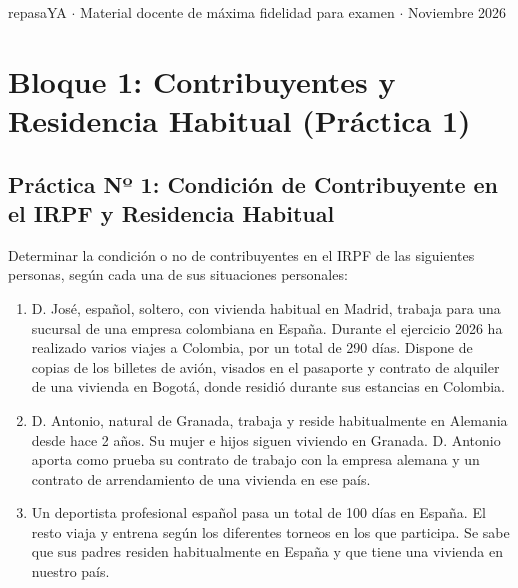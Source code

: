 \documentclass[11pt,a4paper,openany]{article}
\begin{document}
\begin{titlepage}
    \vfill
    {\footnotesize\textsf{\color{gray}repasaYA $\cdot$ Material docente de máxima fidelidad para examen $\cdot$ Noviembre 2026}\par}
\end{titlepage}

\newpage
\tableofcontents
\newpage

\section{Bloque 1: Contribuyentes y Residencia Habitual (Práctica 1)}

\subsection{Práctica Nº 1: Condición de Contribuyente en el IRPF y Residencia Habitual}

\begin{enunciadoBox}
Determinar la condición o no de contribuyentes en el IRPF de las siguientes personas, según cada una de sus situaciones personales:
\begin{enumerate}[label=\textbf{\alph*.}]
    \item D. José, español, soltero, con vivienda habitual en Madrid, trabaja para una sucursal de una empresa colombiana en España. Durante el ejercicio 2026 ha realizado varios viajes a Colombia, por un total de 290 días. Dispone de copias de los billetes de avión, visados en el pasaporte y contrato de alquiler de una vivienda en Bogotá, donde residió durante sus estancias en Colombia.
    \item D. Antonio, natural de Granada, trabaja y reside habitualmente en Alemania desde hace 2 años. Su mujer e hijos siguen viviendo en Granada. D. Antonio aporta como prueba su contrato de trabajo con la empresa alemana y un contrato de arrendamiento de una vivienda en ese país.
    \item Un deportista profesional español pasa un total de 100 días en España. El resto viaja y entrena según los diferentes torneos en los que participa. Se sabe que sus padres residen habitualmente en España y que tiene una vivienda en nuestro país.
\end{enumerate}
\end{enunciadoBox}
\end{document}
